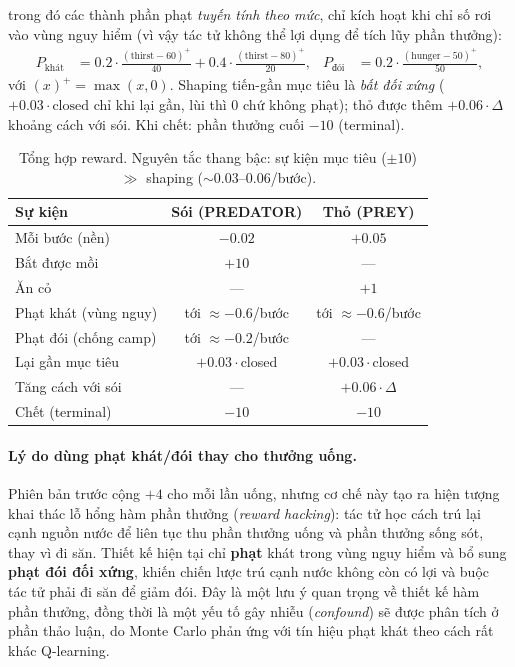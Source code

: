 \documentclass[11pt,a4paper]{article}
\begin{document}
trong đó các thành phần phạt \emph{tuyến tính theo mức}, chỉ kích hoạt khi chỉ số rơi vào vùng nguy
hiểm (vì vậy tác tử không thể lợi dụng để tích lũy phần thưởng):
\begin{align}
P_{\text{khát}} &= 0.2\cdot\tfrac{(\text{thirst}-60)^{+}}{40}
                 + 0.4\cdot\tfrac{(\text{thirst}-80)^{+}}{20}, &
P_{\text{đói}}  &= 0.2\cdot\tfrac{(\text{hunger}-50)^{+}}{50},
\end{align}
với $(x)^{+}=\max(x,0)$. Shaping tiến-gần mục tiêu là \emph{bất đối xứng} ($+0.03\cdot\text{closed}$
chỉ khi lại gần, lùi thì $0$ chứ không phạt); thỏ được thêm $+0.06\cdot\Delta$ khoảng cách với
sói. Khi chết: phần thưởng cuối $-10$ (terminal).

\begin{table}[h]
\centering
\caption{Tổng hợp reward. Nguyên tắc thang bậc: sự kiện mục tiêu ($\pm 10$) $\gg$ shaping ($\sim 0.03$--$0.06$/bước).}
\label{tab:reward}
\small
\begin{tabular}{lcc}
\toprule
Sự kiện & Sói (PREDATOR) & Thỏ (PREY) \\
\midrule
Mỗi bước (nền)        & $-0.02$ & $+0.05$ \\
Bắt được mồi          & $+10$ & --- \\
Ăn cỏ                 & --- & $+1$ \\
Phạt khát (vùng nguy) & tới $\approx -0.6$/bước & tới $\approx -0.6$/bước \\
Phạt đói (chống camp) & tới $\approx -0.2$/bước & --- \\
Lại gần mục tiêu      & $+0.03\cdot$closed & $+0.03\cdot$closed \\
Tăng cách với sói     & --- & $+0.06\cdot\Delta$ \\
Chết (terminal)       & $-10$ & $-10$ \\
\bottomrule
\end{tabular}
\end{table}

\paragraph{Lý do dùng phạt khát/đói thay cho thưởng uống.}
Phiên bản trước cộng $+4$ cho mỗi lần uống, nhưng cơ chế này tạo ra hiện tượng khai thác lỗ hổng
hàm phần thưởng (\emph{reward hacking}): tác tử học cách trú lại cạnh nguồn nước để liên tục thu
phần thưởng uống và phần thưởng sống sót, thay vì đi săn. Thiết kế hiện tại chỉ \textbf{phạt} khát
trong vùng nguy hiểm và bổ sung \textbf{phạt đói đối xứng}, khiến chiến lược trú cạnh nước không
còn có lợi và buộc tác tử phải đi săn để giảm đói. Đây là một lưu ý quan trọng về thiết kế hàm
phần thưởng, đồng thời là một yếu tố gây nhiễu (\emph{confound}) sẽ được phân tích ở phần thảo
luận, do Monte Carlo phản ứng với tín hiệu phạt khát theo cách rất khác Q-learning.
\end{document}
